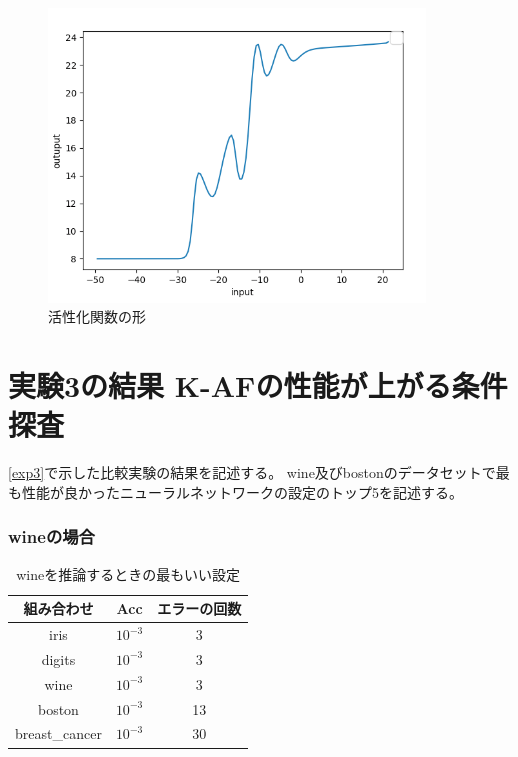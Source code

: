 \begin{figure}[hbtp]
    \begin{center}
        \includegraphics[width=10cm]{asset/boston_0000001_SGDkaiming_normal__non_200_function_2.png}
            \caption{活性化関数の形}
            \label{boston}
    \end{center}
\end{figure}


\section{実験3の結果 K-AFの性能が上がる条件探査}
\label{evo3}
\ref{exp3}で示した比較実験の結果を記述する。
wine及びbostonのデータセットで最も性能が良かったニューラルネットワークの設定のトップ5を記述する。

\subsubsection{wineの場合}

\begin{table}[htbp]
    \begin{center}
        \caption{wineを推論するときの最もいい設定}
        \label{winebest}
        \vspace{2mm} 
        \begin{tabular}{ |c|c|c| }
        組み合わせ & Acc & エラーの回数 \\
        \hline
        iris           & $ 10^{-3} $    & 3 \\
        digits         & $ 10^{-3} $    & 3 \\
        wine           & $ 10^{-3} $    & 3 \\
        boston         & $ 10^{-3} $    & 13  \\
        breast\_cancer & $ 10^{-3} $    & 30 \\
        \end{tabular}
    \end{center}
\end{table}

